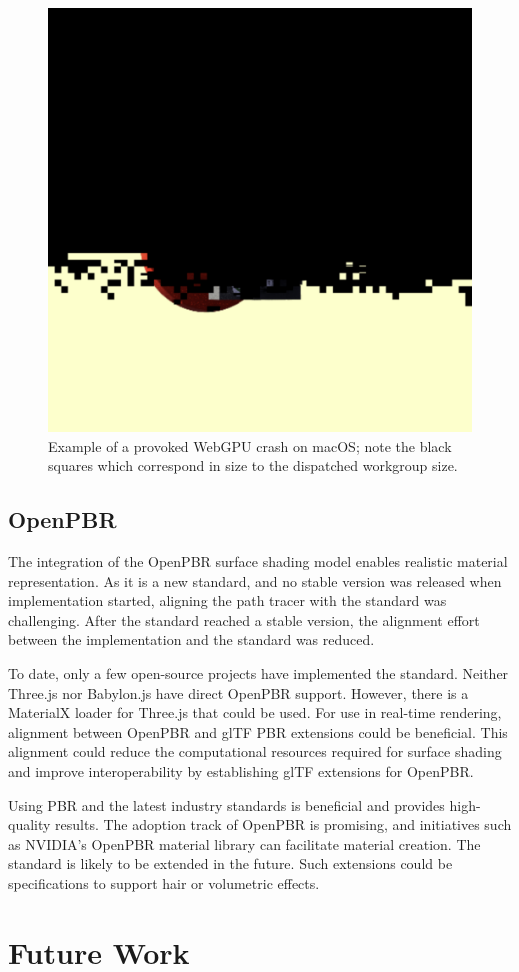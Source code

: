 \begin{figure}[H]
  \centering
  \includegraphics[width=0.25\columnwidth]{resources/webgpu-crashes.png}
  \caption{Example of a provoked \gls{WebGPU} crash on macOS; note the black squares which correspond in size to the dispatched workgroup size.}
  \label{fig:webgpu-crash}
\end{figure}

\subsection*{OpenPBR}

The integration of the \gls{OpenPBR} surface shading model enables realistic material representation. As it is a new standard, and no stable version was released when implementation started, aligning the path tracer with the standard was challenging. After the standard reached a stable version, the alignment effort between the implementation and the standard was reduced.

To date, only a few open-source projects have implemented the standard. Neither \gls{Three.js} nor \gls{Babylon.js} have direct \gls{OpenPBR} support. However, there is a \gls{MaterialX} loader for \gls{Three.js} that could be used. For use in real-time rendering, alignment between \gls{OpenPBR} and \gls{glTF} \gls{PBR} extensions could be beneficial. This alignment could reduce the computational resources required for surface shading and improve interoperability by establishing \gls{glTF} extensions for \gls{OpenPBR}.

Using \gls{PBR} and the latest industry standards is beneficial and provides high-quality results. The adoption track of \gls{OpenPBR} is promising, and initiatives such as NVIDIA's \gls{OpenPBR} material library \cite{omniverseOpenPBR} can facilitate material creation. The standard is likely to be extended in the future. Such extensions could be specifications to support hair or volumetric effects.

\section{Future Work}

